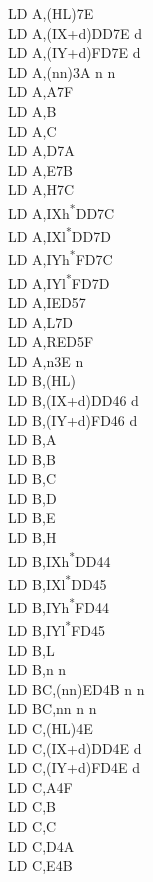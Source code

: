 \documentclass[twoside,openright,a4paper]{book}
\begin{document}
\begin{multicols}{3}
{\begin{tabbing}
	LD A,(HL)\>7E\\
	LD A,(IX+d)\>DD7E d\\
	LD A,(IY+d)\>FD7E d\\
	LD A,(nn)\>3A n n\\
	LD A,A\>7F\\
	LD A,B\\
	LD A,C\\
	LD A,D\>7A\\
	LD A,E\>7B\\
	LD A,H\>7C\\
	LD A,IXh\textsuperscript{*}\>DD7C\\
	LD A,IXl\textsuperscript{*}\>DD7D\\
	LD A,IYh\textsuperscript{*}\>FD7C\\
	LD A,IYl\textsuperscript{*}\>FD7D\\
	LD A,I\>ED57\\
	LD A,L\>7D\\
	LD A,R\>ED5F\\
	LD A,n\>3E n\\
	LD B,(HL)\\
	LD B,(IX+d)\>DD46 d\\
	LD B,(IY+d)\>FD46 d\\
	LD B,A\\
	LD B,B\\
	LD B,C\\
	LD B,D\\
	LD B,E\\
	LD B,H\\
	LD B,IXh\textsuperscript{*}\>DD44\\
	LD B,IXl\textsuperscript{*}\>DD45\\
	LD B,IYh\textsuperscript{*}\>FD44\\
	LD B,IYl\textsuperscript{*}\>FD45\\
	LD B,L\\
	LD B,n n\\
	LD BC,(nn)\>ED4B n n\\
	LD BC,nn n n\\
	LD C,(HL)\>4E\\
	LD C,(IX+d)\>DD4E d\\
	LD C,(IY+d)\>FD4E d\\
	LD C,A\>4F\\
	LD C,B\\
	LD C,C\\
	LD C,D\>4A\\
	LD C,E\>4B\\

\end{tabbing}}
\end{multicols}
\end{document}
